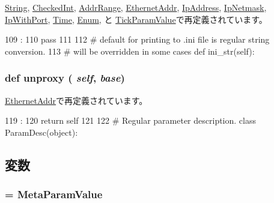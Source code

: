 \hyperlink{classm5_1_1params_1_1String_ab3dbcf5716623eac67a8ccc074fa7e13}{String}, \hyperlink{classm5_1_1params_1_1CheckedInt_ab3dbcf5716623eac67a8ccc074fa7e13}{CheckedInt}, \hyperlink{classm5_1_1params_1_1AddrRange_ab3dbcf5716623eac67a8ccc074fa7e13}{AddrRange}, \hyperlink{classm5_1_1params_1_1EthernetAddr_ab3dbcf5716623eac67a8ccc074fa7e13}{EthernetAddr}, \hyperlink{classm5_1_1params_1_1IpAddress_ab3dbcf5716623eac67a8ccc074fa7e13}{IpAddress}, \hyperlink{classm5_1_1params_1_1IpNetmask_ab3dbcf5716623eac67a8ccc074fa7e13}{IpNetmask}, \hyperlink{classm5_1_1params_1_1IpWithPort_ab3dbcf5716623eac67a8ccc074fa7e13}{IpWithPort}, \hyperlink{classm5_1_1params_1_1Time_ab3dbcf5716623eac67a8ccc074fa7e13}{Time}, \hyperlink{classm5_1_1params_1_1Enum_ab3dbcf5716623eac67a8ccc074fa7e13}{Enum}, と \hyperlink{classm5_1_1params_1_1TickParamValue_ab3dbcf5716623eac67a8ccc074fa7e13}{TickParamValue}で再定義されています。


\begin{DoxyCode}
109                                 :
110         pass
111 
112     # default for printing to .ini file is regular string conversion.
113     # will be overridden in some cases
    def ini_str(self):
\end{DoxyCode}
\hypertarget{classm5_1_1params_1_1ParamValue_a587cd3c1e899640dc09d63793aa8093b}{
\subsubsection[{unproxy}]{\setlength{\rightskip}{0pt plus 5cm}def unproxy ( {\em self}, \/   {\em base})}}
\label{classm5_1_1params_1_1ParamValue_a587cd3c1e899640dc09d63793aa8093b}


\hyperlink{classm5_1_1params_1_1EthernetAddr_a587cd3c1e899640dc09d63793aa8093b}{EthernetAddr}で再定義されています。


\begin{DoxyCode}
119                            :
120         return self
121 
122 # Regular parameter description.
class ParamDesc(object):
\end{DoxyCode}


\subsection{変数}
\hypertarget{classm5_1_1params_1_1ParamValue_adfc4d1824f4ecdcbb04ceafc5bbc933e}{
\subsubsection[{\_\-\_\-metaclass\_\-\_\-}]{ = {\bf MetaParamValue}}}
\label{classm5_1_1params_1_1ParamValue_adfc4d1824f4ecdcbb04ceafc5bbc933e}


